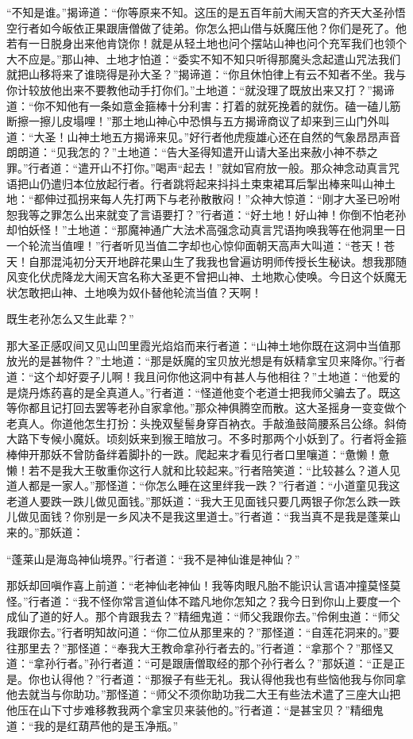 \documentclass[12pt,UTF8]{ctexbook}
\begin{document}
“不知是谁。”揭谛道：“你等原来不知。这压的是五百年前大闹天宫的齐天大圣孙悟空行者如今皈依正果跟唐僧做了徒弟。你怎么把山借与妖魔压他？你们是死了。他若有一日脱身出来他肯饶你！就是从轻土地也问个摆站山神也问个充军我们也领个大不应是。”那山神、土地才怕道：“委实不知不知只听得那魔头念起遣山咒法我们就把山移将来了谁晓得是孙大圣？”揭谛道：“你且休怕律上有云不知者不坐。我与你计较放他出来不要教他动手打你们。”土地道：“就没理了既放出来又打？”揭谛道：“你不知他有一条如意金箍棒十分利害：打着的就死挽着的就伤。磕一磕儿筋断擦一擦儿皮塌哩！”那土地山神心中恐惧与五方揭谛商议了却来到三山门外叫道：“大圣！山神土地五方揭谛来见。”好行者他虎瘦雄心还在自然的气象昂昂声音朗朗道：“见我怎的？”土地道：“告大圣得知遣开山请大圣出来赦小神不恭之罪。”行者道：“遣开山不打你。”喝声“起去！”就如官府放一般。那众神念动真言咒语把山仍遣归本位放起行者。行者跳将起来抖抖土束束裙耳后掣出棒来叫山神土地：“都伸过孤拐来每人先打两下与老孙散散闷！”众神大惊道：“刚才大圣已吩咐恕我等之罪怎么出来就变了言语要打？”行者道：“好土地！好山神！你倒不怕老孙却怕妖怪！”土地道：“那魔神通广大法术高强念动真言咒语拘唤我等在他洞里一日一个轮流当值哩！”行者听见当值二字却也心惊仰面朝天高声大叫道：“苍天！苍天！自那混沌初分天开地辟花果山生了我我也曾遍访明师传授长生秘诀。想我那随风变化伏虎降龙大闹天宫名称大圣更不曾把山神、土地欺心使唤。今日这个妖魔无状怎敢把山神、土地唤为奴仆替他轮流当值？天啊！

既生老孙怎么又生此辈？”

那大圣正感叹间又见山凹里霞光焰焰而来行者道：“山神土地你既在这洞中当值那放光的是甚物件？”土地道：“那是妖魔的宝贝放光想是有妖精拿宝贝来降你。”行者道：“这个却好耍子儿啊！我且问你他这洞中有甚人与他相往？”土地道：“他爱的是烧丹炼药喜的是全真道人。”行者道：“怪道他变个老道士把我师父骗去了。既这等你都且记打回去罢等老孙自家拿他。”那众神俱腾空而散。这大圣摇身一变变做个老真人。你道他怎生打扮：头挽双髽髻身穿百衲衣。手敲渔鼓简腰系吕公绦。斜倚大路下专候小魔妖。顷刻妖来到猴王暗放刁。不多时那两个小妖到了。行者将金箍棒伸开那妖不曾防备绊着脚扑的一跌。爬起来才看见行者口里嚷道：“惫懒！惫懒！若不是我大王敬重你这行人就和比较起来。”行者陪笑道：“比较甚么？道人见道人都是一家人。”那怪道：“你怎么睡在这里绊我一跌？”行者道：“小道童见我这老道人要跌一跌儿做见面钱。”那妖道：“我大王见面钱只要几两银子你怎么跌一跌儿做见面钱？你别是一乡风决不是我这里道士。”行者道：“我当真不是我是蓬莱山来的。”那妖道：

“蓬莱山是海岛神仙境界。”行者道：“我不是神仙谁是神仙？”

那妖却回嗔作喜上前道：“老神仙老神仙！我等肉眼凡胎不能识认言语冲撞莫怪莫怪。”行者道：“我不怪你常言道仙体不踏凡地你怎知之？我今日到你山上要度一个成仙了道的好人。那个肯跟我去？”精细鬼道：“师父我跟你去。”伶俐虫道：“师父我跟你去。”行者明知故问道：“你二位从那里来的？”那怪道：“自莲花洞来的。”要往那里去？”那怪道：“奉我大王教命拿孙行者去的。”行者道：“拿那个？”那怪又道：“拿孙行者。”孙行者道：“可是跟唐僧取经的那个孙行者么？”那妖道：“正是正是。你也认得他？”行者道：“那猴子有些无礼。我认得他我也有些恼他我与你同拿他去就当与你助功。”那怪道：“师父不须你助功我二大王有些法术遣了三座大山把他压在山下寸步难移教我两个拿宝贝来装他的。”行者道：“是甚宝贝？”精细鬼道：“我的是红葫芦他的是玉净瓶。”
\end{document}
